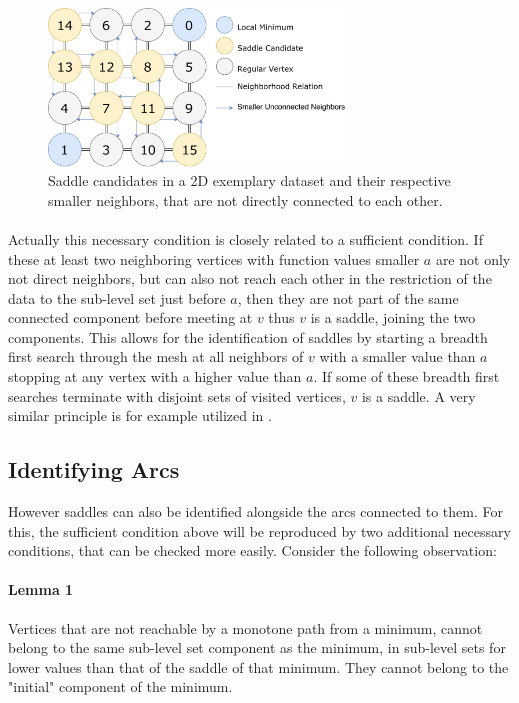 \documentclass[%
	paper=A4,					%
	twoside=true,				%
	openright,					%
	parskip=full,				%
	chapterprefix=true,			%
	11pt,						%
	headings=normal,			%
	bibliography=totoc,			%
	listof=totoc,				%
	titlepage=on,				%
	captions=tableabove,		%
	draft=false,				%
]{scrreprt}%
\begin{document}
\begin{figure}[h!]
\centering
\includegraphics[width=0.7\textwidth]{figures/SaddleCandidatesCrop.pdf}
\caption{Saddle candidates in a 2D exemplary dataset and their respective smaller neighbors, that are not directly connected to each other.}
\label{fig:sc}
\end{figure}

\paragraph{}
Actually this necessary condition is closely related to a sufficient condition. If these at least two neighboring vertices with function values smaller \(a\) are not only not direct neighbors, but can also not reach each other in the restriction of the data to the sub-level set just before \(a\), then they are not part of the same connected component before meeting at \(v\) thus \(v\) is a saddle, joining the two components. This allows for the identification of saddles by starting a breadth first search through the mesh at all neighbors of \(v\) with a smaller value than \(a\) stopping at any vertex with a higher value than \(a\). If some of these breadth first searches terminate with disjoint sets of visited vertices, \(v\) is a saddle. A very similar principle is for example utilized in \cite{Maadasamy}.

\subsection{Identifying Arcs}
However saddles can also be identified alongside the arcs connected to them. For this, the sufficient condition above will be reproduced by two additional necessary conditions, that can be checked more easily. Consider the following observation: 

\paragraph{Lemma 1} Vertices that are not reachable by a monotone path from a minimum, cannot belong to the same sub-level set component as the minimum, in sub-level sets for lower values than that of the saddle of that minimum. They cannot belong to the "initial" component of the minimum.
\end{document}
